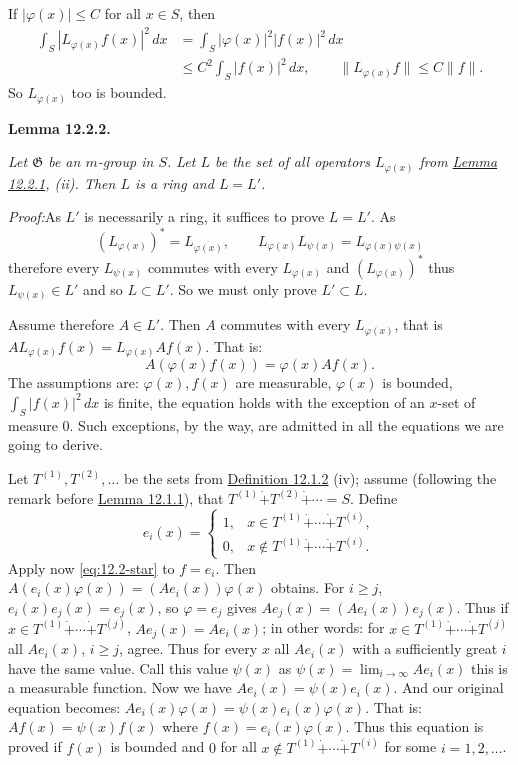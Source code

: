 \documentclass[12pt,b5paper,twoside]{article}
\newcommand{\Lemma}[1]{%
  \par\smallskip\noindent\phantomsection\label{lem:#1}\textbf{Lemma #1.}\enspace
}
\newcommand{\Proof}{\par\noindent\textit{Proof:}\enspace}
\newcommand{\defref}[1]{\hyperref[def:#1]{Definition #1}}
\newcommand{\lemref}[1]{\hyperref[lem:#1]{Lemma #1}}
\begin{document}
If $|\varphi(x)|\leq C$ for all $x\in S$, then
\begin{align*}
 \int_S|L_{\varphi(x)}f(x)|^2\,dx
 &=\int_S|\varphi(x)|^2|f(x)|^2\,dx\\
 &\leq C^2\int_S|f(x)|^2\,dx,
 \qquad \lVert L_{\varphi(x)}f\rVert\leq C\lVert f\rVert.
\end{align*}
So $L_{\varphi(x)}$ too is bounded.

\Lemma{12.2.2}
\emph{Let $\mathfrak G$ be an $m$-group in $S$. Let $L$ be the set of all
operators $L_{\varphi(x)}$ from \lemref{12.2.1}, (ii). Then $L$ is a ring and
$L=L'$.}

\Proof As $L'$ is necessarily a ring, it suffices to prove $L=L'$. As
\[
 (L_{\varphi(x)})^*=L_{\overline{\varphi(x)}},
 \qquad
 L_{\varphi(x)}L_{\psi(x)}=L_{\varphi(x)\psi(x)}
\]
therefore every $L_{\psi(x)}$ commutes with every $L_{\varphi(x)}$ and
$(L_{\varphi(x)})^*$ thus $L_{\psi(x)}\in L'$ and so $L\subset L'$. So we
must only prove $L'\subset L$.

Assume therefore $A\in L'$. Then $A$ commutes with every $L_{\varphi(x)}$,
that is $AL_{\varphi(x)}f(x)=L_{\varphi(x)}Af(x)$. That is:
\begin{equation*}
 A(\varphi(x)f(x))=\varphi(x)Af(x).
 \tag{$*$}\label{eq:12.2-star}
\end{equation*}
The assumptions are: $\varphi(x),f(x)$ are measurable, $\varphi(x)$ is
bounded, $\int_S|f(x)|^2\,dx$ is finite, the equation holds with the exception
of an $x$-set of measure $0$. Such exceptions, by the way, are admitted in all
the equations we are going to derive.

Let $T^{(1)},T^{(2)},\ldots$ be the sets from \defref{12.1.2} (iv); assume
(following the remark before \lemref{12.1.1}), that
$T^{(1)}\mathbin{\dot+}T^{(2)}\mathbin{\dot+}\cdots=S$. Define
\[
 e_i(x)=\begin{cases}
  1,&x\in T^{(1)}\mathbin{\dot+}\cdots\mathbin{\dot+}T^{(i)},\\
  0,&x\notin T^{(1)}\mathbin{\dot+}\cdots\mathbin{\dot+}T^{(i)}.
 \end{cases}
\]
Apply now \eqref{eq:12.2-star} to $f=e_i$. Then
$A(e_i(x)\varphi(x))=(Ae_i(x))\varphi(x)$ obtains. For $i\geq j$,
$e_i(x)e_j(x)=e_j(x)$, so $\varphi=e_j$ gives
$Ae_j(x)=(Ae_i(x))e_j(x)$. Thus if
$x\in T^{(1)}\mathbin{\dot+}\cdots\mathbin{\dot+}T^{(j)}$,
$Ae_j(x)=Ae_i(x)$; in other words: for
$x\in T^{(1)}\mathbin{\dot+}\cdots\mathbin{\dot+}T^{(j)}$ all $Ae_i(x)$,
$i\geq j$, agree. Thus for every $x$ all $Ae_i(x)$ with a sufficiently great
$i$ have the same value. Call this value $\psi(x)$ as
$\psi(x)=\lim_{i\to\infty}Ae_i(x)$ this is a measurable function. Now we have
$Ae_i(x)=\psi(x)e_i(x)$. And our original equation becomes:
$Ae_i(x)\varphi(x)=\psi(x)e_i(x)\varphi(x)$. That is:
$Af(x)=\psi(x)f(x)$ where $f(x)=e_i(x)\varphi(x)$. Thus this equation is
proved if $f(x)$ is bounded and $0$ for all
$x\notin T^{(1)}\mathbin{\dot+}\cdots\mathbin{\dot+}T^{(i)}$ for some
$i=1,2,\ldots$.
\end{document}
